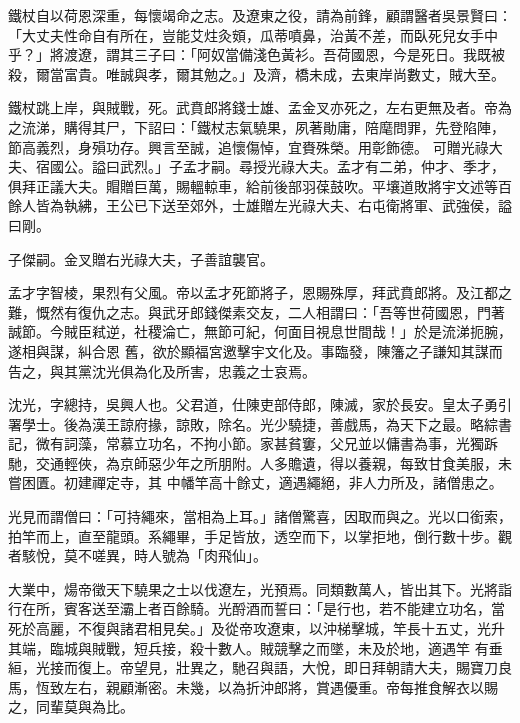 \begin{pinyinscope}
 鐵杖自以荷恩深重，每懷竭命之志。及遼東之役，請為前鋒，顧謂醫者吳景賢曰：「大丈夫性命自有所在，豈能艾炷灸頞，瓜蒂噴鼻，治黃不差，而臥死兒女手中乎？」將渡遼，謂其三子曰：「阿奴當備淺色黃衫。吾荷國恩，今是死日。我既被殺，爾當富貴。唯誠與孝，爾其勉之。」及濟，橋未成，去東岸尚數丈，賊大至。



 鐵杖跳上岸，與賊戰，死。武賁郎將錢士雄、孟金叉亦死之，左右更無及者。帝為之流涕，購得其尸，下詔曰：「鐵杖志氣驍果，夙著勛庸，陪麾問罪，先登陷陣，節高義烈，身殞功存。興言至誠，追懷傷悼，宜賚殊榮。用彰飾德。
 可贈光祿大夫、宿國公。謚曰武烈。」子孟才嗣。尋授光祿大夫。孟才有二弟，仲才、季才，俱拜正議大夫。賵贈巨萬，賜轀輬車，給前後部羽葆鼓吹。平壤道敗將宇文述等百餘人皆為執紼，王公已下送至郊外，士雄贈左光祿大夫、右屯衛將軍、武強侯，謚曰剛。



 子傑嗣。金叉贈右光祿大夫，子善誼襲官。



 孟才字智棱，果烈有父風。帝以孟才死節將子，恩賜殊厚，拜武賁郎將。及江都之難，慨然有復仇之志。與武牙郎錢傑素交友，二人相謂曰：「吾等世荷國恩，門著誠節。今賊臣弒逆，社稷淪亡，無節可紀，何面目視息世間哉！」於是流涕扼腕，遂相與謀，糾合恩
 舊，欲於顯福宮邀擊宇文化及。事臨發，陳籓之子謙知其謀而告之，與其黨沈光俱為化及所害，忠義之士哀焉。



 沈光，字總持，吳興人也。父君道，仕陳吏部侍郎，陳滅，家於長安。皇太子勇引署學士。後為漢王諒府掾，諒敗，除名。光少驍捷，善戲馬，為天下之最。略綜書記，微有詞藻，常慕立功名，不拘小節。家甚貧窶，父兄並以傭書為事，光獨跅馳，交通輕俠，為京師惡少年之所朋附。人多贍遺，得以養親，每致甘食美服，未嘗困匱。初建禪定寺，其
 中幡竿高十餘丈，適遇繩絕，非人力所及，諸僧患之。



 光見而謂僧曰：「可持繩來，當相為上耳。」諸僧驚喜，因取而與之。光以口銜索，拍竿而上，直至龍頭。系繩畢，手足皆放，透空而下，以掌拒地，倒行數十步。觀者駭悅，莫不嗟異，時人號為「肉飛仙」。



 大業中，煬帝徵天下驍果之士以伐遼左，光預焉。同類數萬人，皆出其下。光將詣行在所，賓客送至灞上者百餘騎。光酹酒而誓曰：「是行也，若不能建立功名，當死於高麗，不復與諸君相見矣。」及從帝攻遼東，以沖梯擊城，竿長十五丈，光升其端，臨城與賊戰，短兵接，殺十數人。賊競擊之而墜，未及於地，適遇竿
 有垂絙，光接而復上。帝望見，壯異之，馳召與語，大悅，即日拜朝請大夫，賜寶刀良馬，恆致左右，親顧漸密。未幾，以為折沖郎將，賞遇優重。帝每推食解衣以賜之，同輩莫與為比。




\end{pinyinscope}
